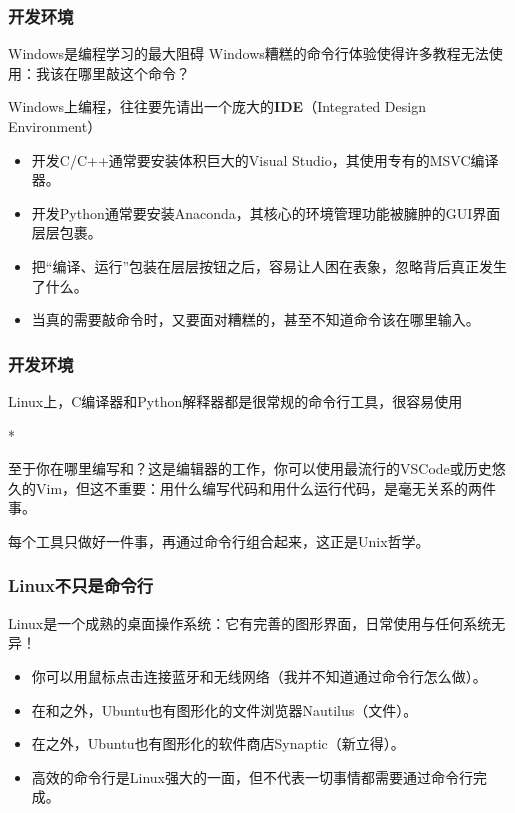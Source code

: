 \begin{frame}
    \frametitle{开发环境}
    \begin{vspquote}{Windows是编程学习的最大阻碍}
        Windows糟糕的命令行体验使得许多教程无法使用：我该在哪里敲这个命令？
    \end{vspquote}
    Windows上编程，往往要先请出一个庞大的\textbf{IDE}（Integrated Design Environment）
    \begin{itemize}
        \item 开发C/C++通常要安装体积巨大的Visual Studio，其使用专有的MSVC编译器。
        \item 开发Python通常要安装Anaconda，其核心的环境管理功能被臃肿的GUI界面层层包裹。
        \item 把“编译、运行”包装在层层按钮之后，容易让人困在表象，忽略背后真正发生了什么。
        \item 当真的需要敲命令时，又要面对糟糕的，甚至不知道命令该在哪里输入。
    \end{itemize}
\end{frame}

\begin{frame}
    \frametitle{开发环境}
    Linux上，C编译器和Python解释器都是很常规的命令行工具，很容易使用
    \begin{Code}*
        
    \end{Code}
    至于你在哪里编写和？这是编辑器的工作，你可以使用最流行的VSCode或历史悠久的Vim，但这不重要：用什么编写代码和用什么运行代码，是毫无关系的两件事。

    每个工具只做好一件事，再通过命令行组合起来，这正是Unix哲学。
\end{frame}

\begin{frame}
    \frametitle{Linux不只是命令行}
    Linux是一个成熟的桌面操作系统：它有完善的图形界面，日常使用与任何系统无异！
    \begin{itemize}
        \item 你可以用鼠标点击连接蓝牙和无线网络（我并不知道通过命令行怎么做）。
        \item 在和之外，Ubuntu也有图形化的文件浏览器Nautilus（文件）。
        \item 在之外，Ubuntu也有图形化的软件商店Synaptic（新立得）。
        \item 高效的命令行是Linux强大的一面，但不代表一切事情都需要通过命令行完成。
    \end{itemize}
\end{frame}

